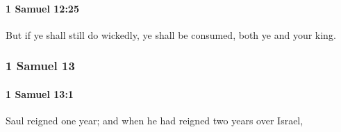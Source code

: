 		\paragraph{1 Samuel 12:25} %
			\label{1SAMUEL-12-25}

			But if ye shall still do wickedly, ye shall be consumed, both ye and your king.

	\subsubsection{1 Samuel 13} %
		\label{1SAMUEL-13}

		\paragraph{1 Samuel 13:1} %
			\label{1SAMUEL-13-1}

			Saul reigned one year; and when he had reigned two years over Israel,

